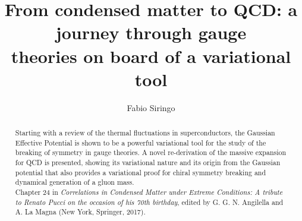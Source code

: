 \documentclass[aps,preprint]{revtex4}
\begin{document}

\title{From condensed matter to QCD: a journey through gauge\\ 
theories on board of a variational tool}
\author{Fabio Siringo}



\begin{abstract}
Starting with a review of the thermal fluctuations in superconductors,
the Gaussian Effective Potential is shown to be a powerful variational tool for
the study of the breaking of symmetry in gauge theories. A novel re-derivation
of the massive expansion for QCD is presented, showing its variational nature and its
origin from the Gaussian potential that also provides a variational proof for
chiral symmetry breaking and dynamical generation of a gluon mass.\\

Chapter 24 in {\it Correlations in Condensed Matter under Extreme 
Conditions: A tribute to Renato Pucci on the occasion of his 70th 
birthday}, edited by G. G. N. Angilella and A. La Magna (New York, 
Springer, 2017).
\end{abstract}






\maketitle
\end{document}
